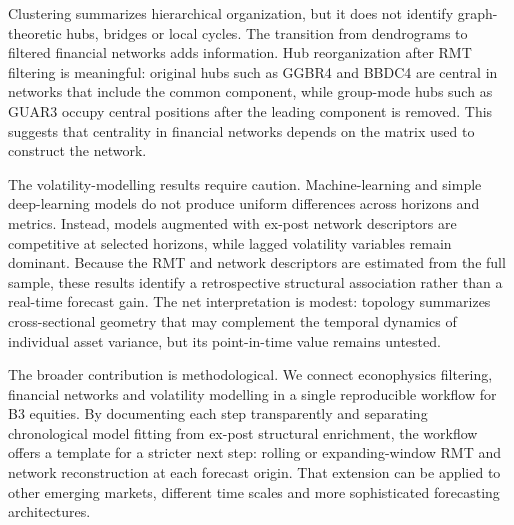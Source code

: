 Clustering summarizes hierarchical organization, but it does not identify graph-theoretic hubs, bridges or local cycles. The transition from dendrograms to filtered financial networks adds information. Hub reorganization after RMT filtering is meaningful: original hubs such as GGBR4 and BBDC4 are central in networks that include the common component, while group-mode hubs such as GUAR3 occupy central positions after the leading component is removed. This suggests that centrality in financial networks depends on the matrix used to construct the network.

The volatility-modelling results require caution. Machine-learning and simple deep-learning models do not produce uniform differences across horizons and metrics. Instead, models augmented with ex-post network descriptors are competitive at selected horizons, while lagged volatility variables remain dominant. Because the RMT and network descriptors are estimated from the full sample, these results identify a retrospective structural association rather than a real-time forecast gain. The net interpretation is modest: topology summarizes cross-sectional geometry that may complement the temporal dynamics of individual asset variance, but its point-in-time value remains untested.

The broader contribution is methodological. We connect econophysics filtering, financial networks and volatility modelling in a single reproducible workflow for B3 equities. By documenting each step transparently and separating chronological model fitting from ex-post structural enrichment, the workflow offers a template for a stricter next step: rolling or expanding-window RMT and network reconstruction at each forecast origin. That extension can be applied to other emerging markets, different time scales and more sophisticated forecasting architectures.
